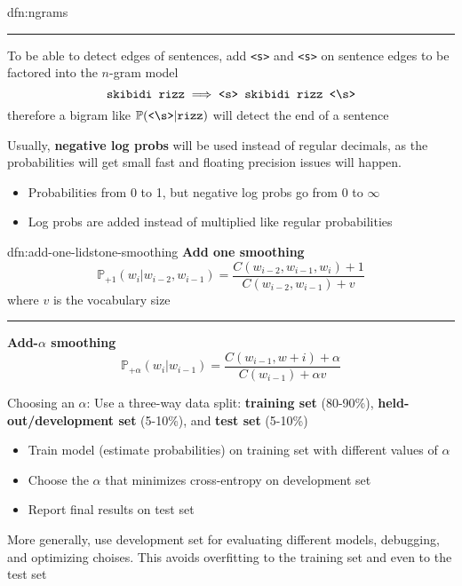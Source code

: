 \documentclass[landscape, 8pt]{extarticle}
\begin{document}
\begin{multicols}{3}
\begin{dfn}{dfn:ngrams}{}
    \noindent\rule{\textwidth}{0.2pt}
    To be able to detect edges of sentences, add \texttt{<s>} and \texttt{<s>} on sentence edges to be factored into the $n$-gram model
    \[\text{\texttt{skibidi rizz}} \implies \text{\texttt{<s> skibidi rizz <\symbol{92}s>}}\]
    therefore a bigram like $\mathbb{P}(\text{\texttt{<\symbol{92}s>}} | \tt{rizz})$ will detect the end of a sentence 

    Usually, \textbf{negative log probs} will be used instead of regular decimals, as the probabilities will get small fast and floating precision issues will happen.
    \begin{itemize}[leftmargin=*]
        \setlength\itemsep{0em}
        \item Probabilities from 0 to 1, but negative log probs go from 0 to $\infty$
        \item Log probs are added instead of multiplied like regular probabilities
    \end{itemize}
\end{dfn}

\begin{dfn}{dfn:add-one-lidstone-smoothing}{}
    \textbf{Add one smoothing}
    \[\mathbb{P}_{+1}(w_{i} | w_{i-2}, w_{i-1}) = \frac{C(w_{i-2}, w_{i-1}, w_{i}) + 1}{C(w_{i - 2}, w_{i-1}) + v}\]
    where $v$ is the vocabulary size

    \noindent\rule{\textwidth}{0.2pt}

    \textbf{Add-$\alpha$ smoothing}
    \[\mathbb{P}_{+\alpha}(w_{i} | w_{i - 1}) = \frac{C(w_{i-1}, w+i) + \alpha}{C(w_{i-1}) + \alpha v}\]

    Choosing an $\alpha$: Use a three-way data split: \textbf{training set} (80-90\%), \textbf{held-out/development set} (5-10\%), and \textbf{test set} (5-10\%)
    \begin{itemize}
        \setlength\itemsep{0em}
        \item Train model (estimate probabilities) on training set with different values of $\alpha$
        \item Choose the $\alpha$ that minimizes cross-entropy on development set
        \item Report final results on test set
    \end{itemize}
    More generally, use development set for evaluating different models, debugging, and optimizing choises. This avoids overfitting to the training set and even to the test set

\end{dfn}


\end{multicols}
\end{document}

